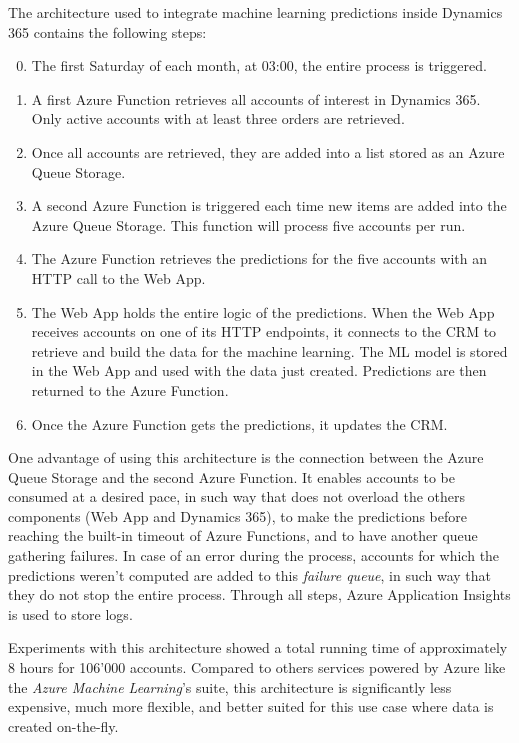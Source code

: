 The architecture used to integrate machine learning predictions inside Dynamics 365 contains the following steps:
\vspace*{-\baselineskip}
\begin{enumerate}[label=\texttt{\arabic*.}]
    \setcounter{enumi}{-1}
    \item The first Saturday of each month, at 03:00, the entire process is triggered.
    \item A first Azure Function retrieves all accounts of interest in Dynamics 365. Only active accounts with at least three orders are retrieved.
    \item Once all accounts are retrieved, they are added into a list stored as an Azure Queue Storage.
    \item A second Azure Function is triggered each time new items are added into the Azure Queue Storage. This function will process five accounts per run.
    \item The Azure Function retrieves the predictions for the five accounts with an HTTP call to the Web App.
    \item The Web App holds the entire logic of the predictions. When the Web App receives accounts on one of its HTTP endpoints, it connects to the CRM to retrieve and build the data for the machine learning. The ML model is stored in the Web App and used with the data just created. Predictions are then returned to the Azure Function.
    \item Once the Azure Function gets the predictions, it updates the CRM.
\end{enumerate}

One advantage of using this architecture is the connection between the Azure Queue Storage and the second Azure Function. It enables accounts to be consumed at a desired pace, in such way that does not overload the others components (Web App and Dynamics 365), to make the predictions before reaching the built-in timeout of Azure Functions, and to have another queue gathering failures. In case of an error during the process, accounts for which the predictions weren't computed are added to this \textit{failure queue}, in such way that they do not stop the entire process. Through all steps, Azure Application Insights is used to store logs.

Experiments with this architecture showed a total running time of approximately 8 hours for 106'000 accounts. Compared to others services powered by Azure like the \textit{Azure Machine Learning}'s suite, this architecture is significantly less expensive, much more flexible, and better suited for this use case where data is created on-the-fly.

